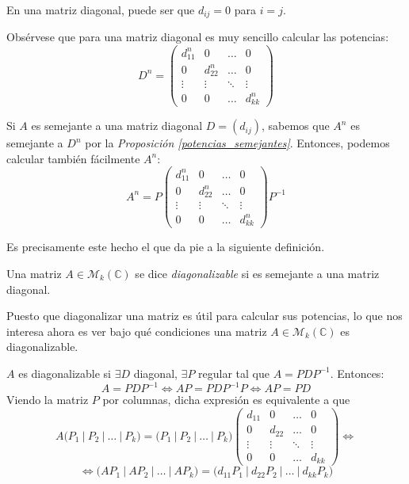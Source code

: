 \begin{nota} En una matriz diagonal, puede ser que $d_{ij} = 0$ para $i=j$.

\end{nota}

Obsérvese que para una matriz diagonal es muy sencillo calcular las potencias:
$$ D^n =
\begin{pmatrix}
  d_{11}^n & 0 & \hdots & 0 \\
  0 & d_{22}^n & \hdots & 0 \\
  \vdots & \vdots & \ddots & \vdots \\
  0 & 0 & \hdots & d_{kk}^n
\end{pmatrix}$$

Si $A$ es semejante a una matriz diagonal $D = (d_{ij})$, sabemos que $A^n$ es semejante a $D^n$ por la \textit{Proposición \ref{potencias_semejantes}}. Entonces, podemos calcular también fácilmente $A^n$: $$A^n = P \begin{pmatrix}
  d_{11}^n & 0 & \hdots & 0 \\
  0 & d_{22}^n & \hdots & 0 \\
  \vdots & \vdots & \ddots & \vdots \\
  0 & 0 & \hdots & d_{kk}^n
\end{pmatrix}P^{-1}$$

Es precisamente este hecho el que da pie a la siguiente definición.

\begin{ndef}
  Una matriz $A \in \mathcal M_k(\mathbb C)$ se dice \textit{diagonalizable} si es
  semejante a una matriz diagonal.
\end{ndef}

Puesto que diagonalizar una matriz es útil para calcular sus potencias, lo que nos interesa ahora es ver bajo qué condiciones una matriz $A \in \mathcal M_k (\mathbb C)$ es diagonalizable.

$A$ es diagonalizable si $\exists D$ diagonal, $\exists P$ regular tal que $A = PDP^{-1}$. Entonces: $$A = PDP^{-1} \iff AP = PDP^{-1}P \iff AP = PD$$
Viendo la matriz $P$ por columnas, dicha expresión es equivalente a que $$A\Bigg(  P_1 \ \Big| \ P_2 \ \Big| \ \dots \ \Big| \ P_k \Bigg) = \Bigg(  P_1 \ \Big| \ P_2 \ \Big| \ \dots \ \Big| \ P_k \Bigg) \begin{pmatrix}
  d_{11} & 0 & \hdots & 0 \\
  0 & d_{22} & \hdots & 0 \\
  \vdots & \vdots & \ddots & \vdots \\
  0 & 0 & \hdots & d_{kk}
\end{pmatrix} \iff$$ $$\iff \Bigg(  AP_1 \ \Big| \ AP_2 \ \Big| \ \dots \ \Big| \ AP_k \Bigg) = \Bigg(  d_{11}P_1 \ \Big| \ d_{22}P_2 \ \Big| \ \dots \ \Big| \ d_{kk}P_k \Bigg)$$

